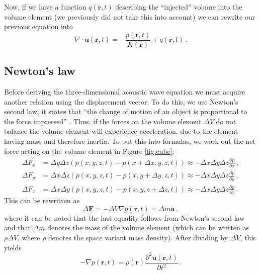 Now, if we have a function $q(\mathbf r, t)$ describing the ``injected'' volume into the volume element (we previously did not take this into account) we can rewrite our previous equation into
\begin{equation}
    \nabla \cdot \mathbf u(\mathbf r, t) = -\frac{p(\mathbf r, t)}{K(\mathbf r)} + q(\mathbf r, t) \,. \label{eq:part1}
\end{equation}

\subsection{Newton's law}
Before deriving the three-dimensional acoustic wave equation we must acquire another relation using the displacement vector.
To do this, we use Newton's second law, it states that ``the change of motion of an object is proportional to the force impressed'' \cites[Section 6.2]{Book_Newton}[Section 1.1]{Book_Newton_2}.
Thus, if the forces on the volume element $\Delta V$ do not balance the volume element will experience acceleration, due to the element having mass and therefore inertia.
To put this into formulas, we work out the net force acting on the volume element in Figure \ref{fig:cube}:
\begin{align}
    \Delta F_x &= \Delta y \Delta z (p(x, y, z, t) - p(x+\Delta x, y, z, t)) \approx - \Delta x \Delta y \Delta z \frac{\partial p}{\partial x} \,,\nonumber \\
    \Delta F_y &= \Delta x \Delta z (p(x, y, z, t) - p(x, y+\Delta y, z, t)) \approx - \Delta x \Delta y \Delta z \frac{\partial p}{\partial y} \,,\nonumber \\
    \Delta F_z &= \Delta x \Delta y (p(x, y, z, t) - p(x, y, z+\Delta z, t)) \approx - \Delta x \Delta y \Delta z \frac{\partial p}{\partial z} \,.\nonumber
\end{align}
This can be rewritten as
\begin{equation}
    \Delta \mathbf F = - \Delta V \nabla p(\mathbf r, t) = \Delta m \mathbf a \,, \nonumber
\end{equation}
where it can be noted that the last equality follows from Newton's second law and that $\Delta m$ denotes the mass of the volume element (which can be written as $\rho \Delta V$, where $\rho$ denotes the space variant mass density).
After dividing by $\Delta V$, this yields
\begin{equation}
    - \nabla p (\mathbf r, t) = \rho(\mathbf r) \frac{\partial^2 \mathbf u(\mathbf r, t)}{\partial t^2} \,.\nonumber
\end{equation}

